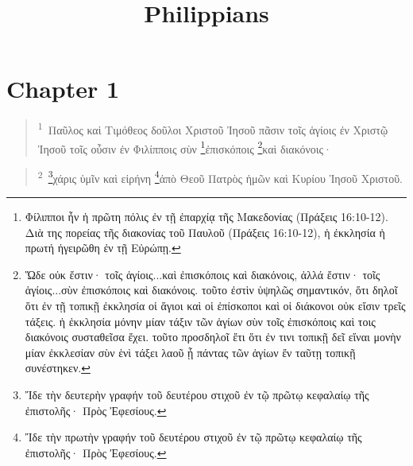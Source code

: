 \documentclass{article}
\newcommand{\currentverse}{1} %
\newcommand{\setcurrentverse}[1]{\renewcommand{\currentverse}{#1}}
\newcounter{versecounter}
\newcommand{\newverse}{%
  \stepcounter{versecounter}%
  \setcounter{footnote}{0}%
}
\renewcommand{\thefootnote}{\textsuperscript{\theversecounter\textsuperscript{\arabic{footnote}}}}
\begin{document}

\newcommand{\versenum}[1]{%
  \newverse%
  \textcolor{verseblue}{#1}%
}

\renewcommand{\thefootnote}{\textcolor{footnotered}{\arabic{footnote}}}

\title{Philippians}
\date{}
\maketitle
\section*{Chapter 1}

\begin{verse}

\setcurrentverse{1}

\setcounter{footnote}{0}

\textsuperscript{1}~Παῦλος καὶ Τιμόθεος δοῦλοι Χριστοῦ Ἰησοῦ πᾶσιν τοῖς ἁγίοις ἐν Χριστῷ Ἰησοῦ τοῖς οὖσιν ἐν Φιλίπποις σὺν \footnote{Φίλιπποι ἦν ἡ πρῶτη πόλις ἐν τῇ ἐπαρχίᾳ τῆς Μακεδονίας (Πράξεις 16:10-12). Διὰ της πορείας τῆς διακονίας τοῦ Παυλοῦ (Πράξεις 16:10-12), ἡ ἐκκλησία ἡ πρωτή ἠγειρῶθη ἐν τῇ Εὐρώπῃ.}ἐπισκόποις \footnote{Ὥδε οὐκ ἔστιν· τοῖς ἁγίοις...καὶ ἐπισκόποις καὶ διακόνοις, ἀλλά ἔστιν· τοῖς ἁγίοις...σὺν ἐπισκόποις καὶ διακόνοις. τοῦτο ἐστὶν ὑψηλῶς σημαντικόν, ὅτι δηλοῖ ὅτι ἐν τῇ τοπικῇ ἐκκλησία οἱ ἅγιοι καὶ οἱ ἐπίσκοποι καὶ οἱ διάκονοι οὐκ εἴσιν τρεῖς τάξεις. ἡ ἐκκλησία μόνην μίαν τάξιν τῶν ἁγίων σὺν τοῖς ἐπισκόποις καὶ τοις διακόνοις συσταθεῖσα ἔχει. τοῦτο προσδηλοῖ ἔτι ὅτι ἐν τινι τοπικῇ δεῖ εἴναι μονὴν μίαν ἐκκλεσίαν σὺν ἑνὶ τάξει λαοῦ ᾗ πάντας τῶν ἁγίων ἔν ταῦτῃ τοπικῇ συνέστηκεν.}καὶ διακόνοις·

\end{verse}

\begin{verse}

\setcurrentverse{2}

\setcounter{footnote}{0}

\textsuperscript{2}~\footnote{Ἴδε τὴν δευτερὴν γραφήν τοῦ δευτέρου στιχοῦ ἐν τῷ πρῶτῳ κεφαλαίῳ τῆς ἐπιστολῆς· Πρὸς Ἐφεσίους.}χάρις ὑμῖν καὶ εἰρήνη \footnote{Ἴδε τὴν πρωτὴν γραφήν τοῦ δευτέρου στιχοῦ ἐν τῷ πρῶτῳ κεφαλαίῳ τῆς ἐπιστολῆς· Πρὸς Ἐφεσίους.}ἀπὸ Θεοῦ Πατρὸς ἡμῶν καὶ Κυρίου Ἰησοῦ Χριστοῦ.

\end{verse}
\end{document}
